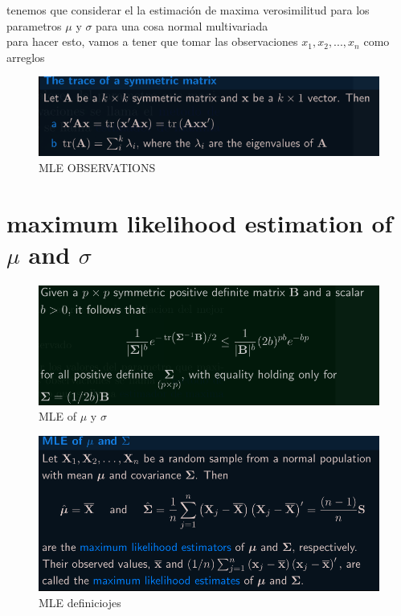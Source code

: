 \documentclass[10pt,a4paper]{article} %
\begin{document}
        tenemos que considerar el la estimación de maxima verosimilitud para
        los parametros $ \mu  $  y $ \sigma   $  para una cosa normal
        multivariada
        \\ para hacer esto, vamos a tener que tomar las observaciones $ x_1 ,
        x_2 , ... , x_n  $ como arreglos

        \begin{figure}[h!]
            \centering
            \includegraphics[width=0.8\linewidth]{mle.png}
            \caption{MLE OBSERVATIONS}
            \label{shit fuck i hate this shit pls anyone kill me}
        \end{figure}

    \section{maximum likelihood estimation of $ \mu  $  and $ \sigma   $ }

        \begin{figure}[h!]
            \centering
            \includegraphics[width=0.8\linewidth]{mle2.png}
            \caption{MLE of $ \mu  $ y $ \sigma   $ }
            \label{fig}
        \end{figure}

        \begin{figure}[h!]
            \centering
            \includegraphics[width=0.8\linewidth]{mle3.png}
            \caption{MLE definiciojes}
            \label{kill me}
        \end{figure}
\end{document}

